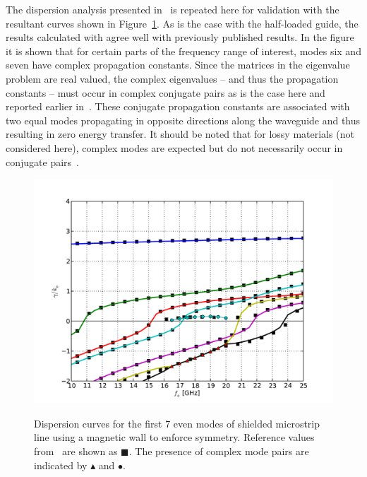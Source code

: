 The dispersion analysis presented in~\cite{PelosiCoccioliSelleri1998} is repeated
here for validation with the resultant curves shown in
Figure~\ref{lezar:fig:shielded_microstrip_dispersion_curves}. As is the case
with the half-loaded guide, the results calculated with \fenics{}
agree well with previously published results. In the figure it is
shown that for certain parts of the frequency range of interest, modes
six and seven have complex propagation constants. Since the matrices
in the eigenvalue problem are real valued, the complex eigenvalues --
and thus the propagation constants -- must occur in complex conjugate
pairs as is the case here and reported earlier
in~\cite{HuangItoh1988}. These conjugate propagation constants are
associated with two equal modes propagating in opposite directions
along the waveguide and thus resulting in zero energy transfer. It
should be noted that for lossy materials (not considered here),
complex modes are expected but do not necessarily occur in conjugate
pairs~\cite{PelosiCoccioliSelleri1998}.
\begin{figure}[h]
 \centering
 \includegraphics[width=\largefig]{chapters/lezar/pdf/shielded_microstrip_dispersion_curve.pdf}
 \caption{Dispersion curves for the first 7 even modes of shielded microstrip line using a magnetic wall to enforce symmetry.  Reference values from~\cite{PelosiCoccioliSelleri1998} are shown as $\blacksquare$.  The presence of complex mode pairs are indicated by $\blacktriangle$ and $\bullet$.}
 \label{lezar:fig:shielded_microstrip_dispersion_curves}
\end{figure}
\label{lezar:sec:shielded_microstrip|)}
